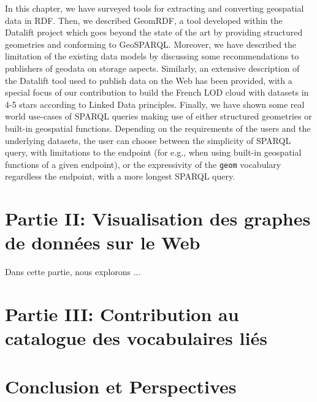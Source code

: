 \documentclass[a4paper,11pt,twoside]{report}
\begin{document}
In this chapter, we have surveyed tools for extracting and converting geospatial data in RDF. Then, we described GeomRDF, a tool developed within the Datalift project which goes beyond the state of the art by providing structured geometries and conforming to GeoSPARQL. Moreover, we have described the limitation of the existing data models by discussing some recommendations to publishers of geodata on storage aspects. Similarly, an extensive description of the Datalift tool used to publish data on the Web has been provided, with a special focus of our contribution to build the French LOD cloud with datasets in 4-5 stars according to Linked Data principles. Finally, we have shown some real world use-cases of SPARQL queries making use of either structured geometries or built-in geospatial functions. Depending on the requirements of the users and the underlying datasets, the user can choose between the simplicity of SPARQL query, with limitations to the endpoint (for e.g., when using built-in geospatial functions of a given endpoint), or the expressivity of the \texttt{geom} vocabulary regardless the endpoint, with a more longest SPARQL query.

\chapter*{Partie II: Visualisation des graphes de données sur le Web}

Dans cette partie, nous explorons ...

\chapter*{Partie III: Contribution au catalogue des vocabulaires liés}



\chapter*{ Conclusion et Perspectives}
\label{ch:conc}
\end{document}

